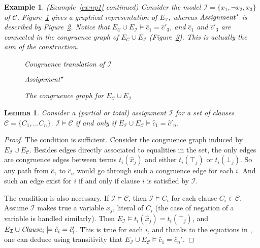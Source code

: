 \documentclass{easychair}
\newtheorem{example}{Example}
\newtheorem{lemma}{Lemma}
\begin{document}
\begin{example}\label{ex:np2} (Example~\ref{ex:np1} continued)  
Consider the model $\mathcal{I} = \{x_1, \neg x_2, x_3\}$ of $\mathcal{C}$.
Figure~\ref{fig:npassignment} gives a graphical representation of
$E_{\mathcal{I}}$, whereas ${\it Assignment}^\star$ is described by
Figure~\ref{fig:npassignmentstar}.  Notice that
$E_{\mathcal{C}} \cup E_{\mathcal{I}} \models \hat{c}_1 = \hat{c}'_3$,
and $\hat{c}_1$ and $\hat{c}'_3$ are connected in the congruence graph
of $E_{\mathcal{C}} \cup E_{\mathcal{I}}$ (Figure~\ref{fig:npmodel}).
This is actually the aim of the construction.

\begin{figure}[ht]

\caption{Congruence translation of $\mathcal{I}$}
\label{fig:npassignment}
\end{figure}

\begin{figure}[ht]

\caption{${\it Assignment}^\star$}
\label{fig:npassignmentstar}
\end{figure}
\begin{figure}[ht]

\caption{The congruence graph for $E_{\mathcal{C}} \cup E_{\mathcal{I}}$}
\label{fig:npmodel}
\end{figure}
\end{example}

\begin{lemma}
\label{lemma:eqv}
Consider a (partial or total) assignment $\mathcal{I}$ for a set of clauses
$\mathcal{C}= \{C_1, \dots C_n\}$.  $\mathcal{I} \models \mathcal{C}$ if and only if
$E_{\mathcal{I}} \cup E_\mathcal{C} \models \hat{c}_1 = \hat{c}'_n$.
\end{lemma}
\begin{proof}
The condition is sufficient.  Consider the congruence graph induced by
$E_{\mathcal{I}} \cup E_\mathcal{C}$.  Besides edges directly associated to
equalities in the set, the only edges are congruence edges between terms
$t_i(\hat{x}_j)$ and either $t_i(\top_j)$ or $t_i(\bot_j)$.  So any path from
$\hat{c}_1$ to $\hat{c}_n$ would go through such a congruence edge for each $i$.
And such an edge exist for $i$ if and only if clause $i$ is satisfied by
$\mathcal{I}$.

The condition is also necessary.  If $\mathcal{I} \models \mathcal{C}$, then
$\mathcal{I} \models C_i$ for each clause $C_i \in \mathcal{C}$.  Assume
$\mathcal{I}$ makes true a variable $x_j$, literal of $C_i$ (the case of
negation of a variable is handled similarly).  Then $E_{\mathcal{I}} \models
t_i(\hat{x}_j) = t_i(\top_j)$, and $E_{\mathcal{I}} \cup {\it Clause}_i
\models \hat{c}_i = \hat{c}_i'$.  This is true for each $i$, and
thanks to the equations in \Connect, one can deduce using transitivity that
$E_{\mathcal{I}} \cup E_\mathcal{C} \models \hat{c}_1 = \hat{c}_n'$.
\end{proof}
\end{document}
